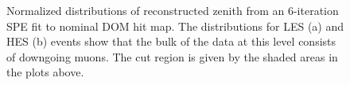 \documentclass{gatech-thesis}
\begin{document}
\begin{figure}
\centering
{}
\caption[L4 SPE6 Zenith Reconstruction]{Normalized distributions of reconstructed zenith from an 6-iteration SPE fit to nominal DOM hit map. The distributions for LES (a) and HES (b) events show that the bulk of the data at this level consists of downgoing muons. The cut region is given by the shaded areas in the plots above.} 
\label{fig:SPE6Recos}
\end{figure}
\end{document}
